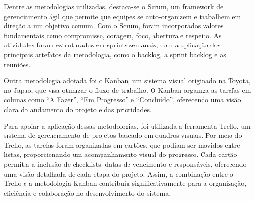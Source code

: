 Dentre as metodologias utilizadas, destaca-se o Scrum, um framework de gerenciamento ágil
que permite que equipes se auto-organizem e trabalhem em direção a um objetivo comum.
Com o Scrum, foram incorporados valores fundamentais como compromisso, coragem, foco,
abertura e respeito. As atividades foram estruturadas em sprints semanais, com a aplicação
dos principais artefatos da metodologia, como o backlog, a sprint backlog e as reuniões. \textcite{Scrum2022}

Outra metodologia adotada foi o Kanban, um sistema visual originado na Toyota, no Japão,
que visa otimizar o fluxo de trabalho. O Kanban organiza as tarefas em colunas como “A
Fazer”, “Em Progresso” e “Concluído”, oferecendo uma visão clara do andamento do projeto e
das prioridades. \textcite{TOTVSKanban}

Para apoiar a aplicação dessas metodologias, foi utilizada a ferramenta Trello, um sistema de
gerenciamento de projetos baseado em quadros visuais. Por meio do Trello, as tarefas foram
organizadas em cartões, que podiam ser movidos entre listas, proporcionando um
acompanhamento visual do progresso. Cada cartão permitia a inclusão de checklists, datas
de vencimento e responsáveis, oferecendo uma visão detalhada de cada etapa do projeto.
Assim, a combinação entre o Trello e a metodologia Kanban contribuiu significativamente
para a organização, eficiência e colaboração no desenvolvimento do sistema. \textcite{MagalhaesTrello} 
